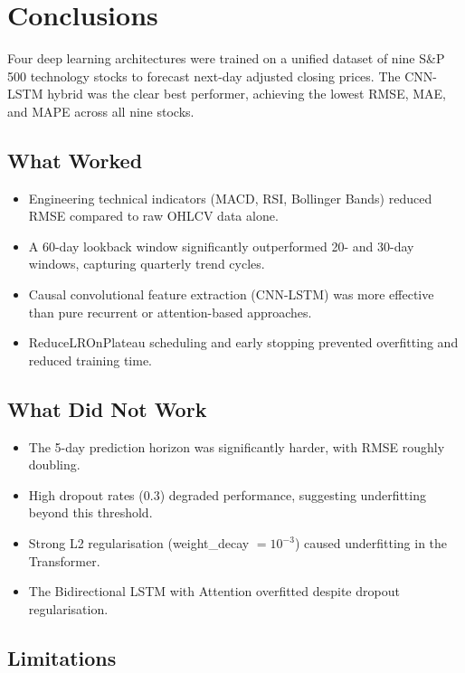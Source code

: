 \documentclass[12pt, a4paper]{article}
\begin{document}
\section{Conclusions}

Four deep learning architectures were trained on a unified dataset of nine S\&P 500 technology stocks to forecast next-day adjusted closing prices. The CNN-LSTM hybrid was the clear best performer, achieving the lowest RMSE, MAE, and MAPE across all nine stocks.

\subsection{What Worked}

\begin{itemize}
  \item Engineering technical indicators (MACD, RSI, Bollinger Bands) reduced RMSE compared to raw OHLCV data alone.
  \item A 60-day lookback window significantly outperformed 20- and 30-day windows, capturing quarterly trend cycles.
  \item Causal convolutional feature extraction (CNN-LSTM) was more effective than pure recurrent or attention-based approaches.
  \item ReduceLROnPlateau scheduling and early stopping prevented overfitting and reduced training time.
\end{itemize}

\subsection{What Did Not Work}

\begin{itemize}
  \item The 5-day prediction horizon was significantly harder, with RMSE roughly doubling.
  \item High dropout rates (0.3) degraded performance, suggesting underfitting beyond this threshold.
  \item Strong L2 regularisation (weight\_decay $= 10^{-3}$) caused underfitting in the Transformer.
  \item The Bidirectional LSTM with Attention overfitted despite dropout regularisation.
\end{itemize}

\subsection{Limitations}
\end{document}
